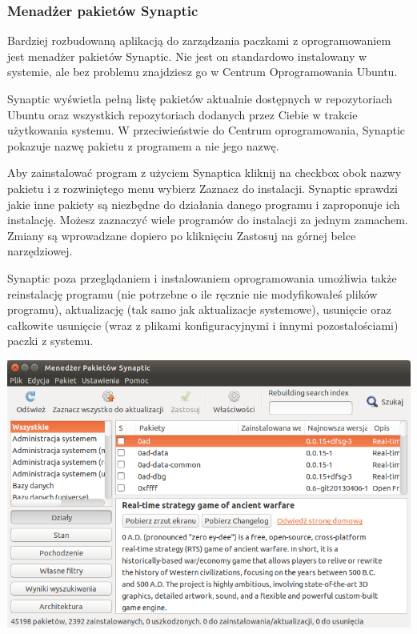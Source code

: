 \subsubsection{Menadżer pakietów Synaptic}
Bardziej rozbudowaną aplikacją do zarządzania paczkami z oprogramowaniem jest menadżer pakietów \textcolor{ubuntu_orange}{Synaptic}. Nie jest on standardowo instalowany w systemie, ale bez problemu znajdziesz go w Centrum Oprogramowania Ubuntu.

Synaptic wyświetla pełną listę pakietów aktualnie dostępnych w repozytoriach Ubuntu oraz wszystkich repozytoriach dodanych przez Ciebie w trakcie użytkowania systemu. W przeciwieństwie do Centrum oprogramowania, Synaptic pokazuje nazwę pakietu z programem a nie jego nazwę.

Aby zainstalować program z użyciem Synaptica kliknij na checkbox obok nazwy pakietu i z rozwiniętego menu wybierz \textcolor{ubuntu_orange}{Zaznacz do instalacji}. Synaptic sprawdzi jakie inne pakiety są niezbędne do działania danego programu i zaproponuje ich instalację. Możesz zaznaczyć wiele programów do instalacji za jednym zamachem. Zmiany są wprowadzane dopiero po kliknięciu \textcolor{ubuntu_orange}{Zastosuj} na górnej belce narzędziowej.

Synaptic poza przeglądaniem i instalowaniem oprogramowania umożliwia także reinstalację programu (nie potrzebne o ile ręcznie nie modyfikowałeś plików programu), aktualizację (tak samo jak aktualizacje systemowe), usunięcie oraz całkowite usunięcie (wraz z plikami konfiguracyjnymi i innymi pozostałościami) paczki z systemu.

\begin{center}
	\includegraphics[width=\linewidth]{images/programy_synaptic.png}
\end{center}

